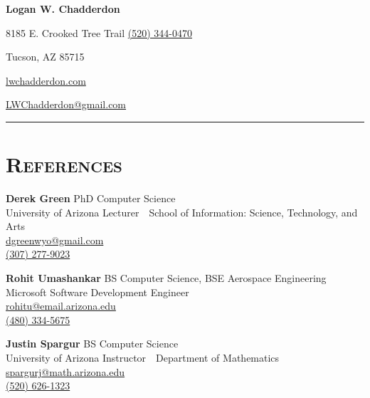 \documentclass[11pt,letterpaper]{article}
\newcommand{\bsk}{\par\vspace{\baselineskip}}
\begin{document}
\begin{minipage}{\textwidth}

\begin{center}
\LARGE \bfseries Logan W. Chadderdon
\end{center}

8185 E. Crooked Tree Trail \hfill \href{tel:(520) 344-0470}{(520) 344-0470}

\vspace{-3mm}
\begin{multicols}{3}
Tucson, AZ 85715 

\begin{center}
\href{http://lwchadderdon.com}{lwchadderdon.com}
\end{center}

\hfill \href{mailto:LWChadderdon@gmail.com}{LWChadderdon@gmail.com}

\end{multicols}

\vspace{-1mm}
\hrule

\bsk
\section{\scshape References}

\bsk
{\bfseries Derek Green} \hfill PhD Computer Science\\
University of Arizona \hfill Lecturer~\textbullet~School of Information: Science, Technology, and Arts\\
\href{mailto:dgreenwyo@gmail.com}{dgreenwyo@gmail.com}\\
\href{tel:(307) 277-9023}{(307) 277-9023}

\bsk
\bsk
{\bfseries Rohit Umashankar} \hfill BS Computer Science, BSE Aerospace Engineering\\
Microsoft \hfill Software Development Engineer\\
\href{mailto:rohitu@email.arizona.edu}{rohitu@email.arizona.edu}\\
\href{tel:(480) 334-5675}{(480) 334-5675}

\bsk
\bsk
{\bfseries Justin Spargur} \hfill BS Computer Science\\
University of Arizona \hfill Instructor~\textbullet~Department of Mathematics\\
\href{mailto:spargurj@math.arizona.edu}{spargurj@math.arizona.edu}\\
\href{tel:(520) 626-1323}{(520) 626-1323}

\end{minipage}
\end{document}
